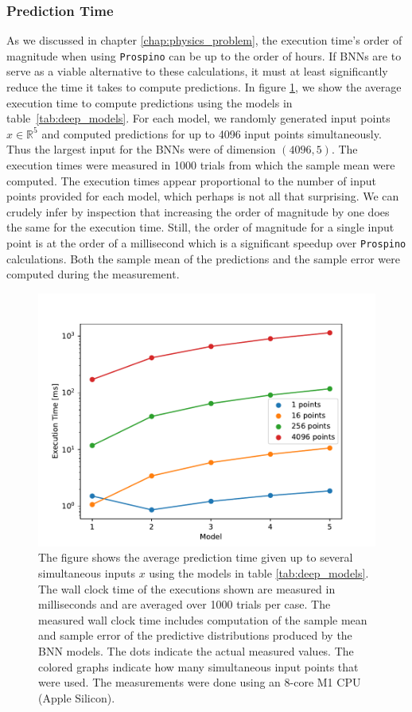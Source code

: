 \subsubsection{Prediction Time}
As we discussed in chapter \ref{chap:physics_problem}, the execution time's order of magnitude when using {\tt Prospino} can be up to the order of hours. 
If BNNs are to serve as a viable alternative to these calculations, it must at least significantly reduce the time it takes to compute predictions. In figure \ref{fig:prediction_time}, we 
show the average execution time to compute predictions using the models in table~\ref{tab:deep_models}.
For each model, we randomly generated input points $x\in \mathbb{R}^5$ and computed predictions for up to 4096 input points simultaneously.
Thus the largest input for the BNNs were of dimension $(4096, 5)$. The execution times were measured in 1000 trials from which the sample mean were computed.
The execution times appear proportional to the number of input points provided for each model, which perhaps is not all that surprising. We can crudely infer by inspection that increasing the order of magnitude by one does the same for the execution time. Still, the order of magnitude for a single input point is at the order of a millisecond which is a significant speedup over {\tt Prospino} calculations. Both the sample mean of the predictions and the sample error were computed during the measurement. 

\begin{figure}[H]
    \centering
    \includegraphics[scale=0.7]{figures/prediction_time/prediction_time.pdf}
    \caption{The figure shows the average prediction time given up to several simultaneous inputs $x$ using the models in table \ref{tab:deep_models}. The wall clock time of the executions shown are measured in milliseconds and are averaged over 1000 trials per case. The measured wall clock time includes computation of the sample mean and sample error of the predictive distributions produced by the BNN models. The dots indicate the actual measured values. The colored graphs indicate how many simultaneous input points that were used. The measurements were done using an 8-core M1 CPU (Apple Silicon).
    }
    \label{fig:prediction_time}
\end{figure}

